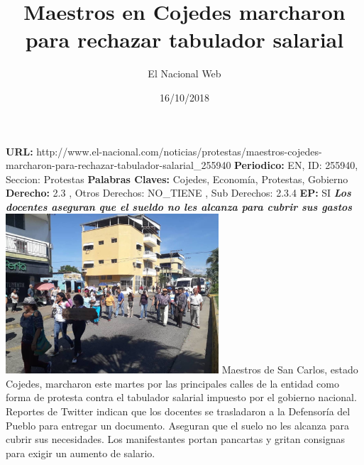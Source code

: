 \documentclass{article}%
\title{\textbf{Maestros en Cojedes marcharon para rechazar tabulador salarial}}%
\author{El Nacional Web}%
\date{16/10/2018}%
\begin{document}
%
\normalsize%
\maketitle%
\textbf{URL: }%
http://www.el{-}nacional.com/noticias/protestas/maestros{-}cojedes{-}marcharon{-}para{-}rechazar{-}tabulador{-}salarial\_255940\newline%
%
\textbf{Periodico: }%
EN, %
ID: %
255940, %
Seccion: %
Protestas\newline%
%
\textbf{Palabras Claves: }%
Cojedes, Economía, Protestas, Gobierno\newline%
%
\textbf{Derecho: }%
2.3%
, Otros Derechos: %
NO\_TIENE%
, Sub Derechos: %
2.3.4%
\newline%
%
\textbf{EP: }%
SI\newline%
\newline%
%
\textbf{\textit{Los docentes aseguran que el sueldo no les alcanza para cubrir sus gastos}}%
\newline%
\newline%
%
\includegraphics[width=300px]{80.jpg}%
\newline%
%
Maestros de San Carlos, estado Cojedes, marcharon este martes por las principales calles de la entidad como forma de protesta contra el tabulador salarial impuesto por el gobierno nacional.%
\newline%
%
Reportes de Twitter indican que los docentes se trasladaron a la Defensoría del Pueblo para entregar un documento. Aseguran que el suelo no les alcanza para cubrir sus necesidades.%
\newline%
%
Los manifestantes portan pancartas y gritan consignas para exigir un aumento de salario.%
\newline%
%
\end{document}
